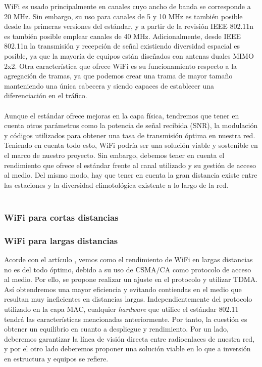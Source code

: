 WiFi es usado principalmente en canales cuyo ancho de banda se corresponde a 20 MHz. Sin embargo, su uso para canales de 5 y 10 MHz es también posible desde las primeras versiones del estándar, y a partir de la revisión IEEE 802.11n es también posible emplear canales de 40 MHz. Adicionalmente, desde IEEE 802.11n la transmisión y recepción de señal existiendo diversidad espacial es posible, ya que la mayoría de equipos están diseñados con antenas duales MIMO 2x2. Otra característica que ofrece WiFi es su funcionamiento respecto a la agregación de tramas, ya que podemos crear una trama de mayor tamaño manteniendo una única cabecera y siendo capaces de establecer una diferenciación en el tráfico. \\\\
		
Aunque el estándar ofrece mejoras en la capa física, tendremos que tener en cuenta otros parámetros como la potencia de señal recibida (SNR), la modulación y códigos utilizados para obtener una tasa de transmisión óptima en nuestra red. Teniendo en cuenta todo esto, WiFi podría ser una solución viable y sostenible en el marco de nuestro proyecto. Sin embargo, debemos tener en cuenta el rendimiento que ofrece el estándar frente al canal utilizado y su gestión de acceso al medio. Del mismo modo, hay que tener en cuenta la gran distancia existe entre las estaciones y la diversidad climotológica existente a lo largo de la red.\\\\

\subsubsection{WiFi para cortas distancias}

\subsubsection{WiFi para largas distancias}


Acorde con el artículo \cite{simo2014assessing}, vemos como el rendimiento de WiFi en largas distancias no es del todo óptimo, debido a su uso de CSMA/CA como protocolo de acceso al medio. Por ello, se propone realizar un ajuste en el protocolo y utilizar TDMA. Así obtendremos una mayor eficiencia y evitando contiendas en el medio que resultan muy ineficientes en distancias largas. Independientemente del protocolo utilizado en la capa MAC, cualquier \textit{hardware} que utilice el estándar 802.11 tendrá las características mencionadas anteriormente. Por tanto, la cuestión es obtener un equilibrio en cuanto a despliegue y rendimiento. Por un lado, deberemos garantizar la línea de visión directa entre radioenlaces de nuestra red, y por el otro lado deberemos proponer una solución viable en lo que a inversión en estructura y equipos se refiere.\\\\

